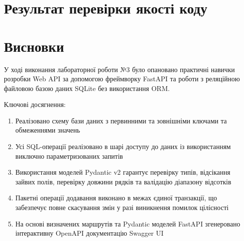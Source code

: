 \documentclass[12pt, a4paper]{article}
\begin{document}
\section{Результат перевірки якості коду}
\section{Висновки}
У ході виконання лабораторної роботи №3 було опановано практичні навички розробки Web API за допомогою фреймворку FastAPI та роботи з реляційною файловою базою даних SQLite без використання ORM.

Ключові досягнення:
\begin{enumerate}
	\item Реалізовано схему бази даних з первинними та зовнішніми ключами та обмеженнями значень
	\item Усі SQL-операції реалізовано в шарі доступу до даних із використанням виключно параметризованих запитів
	\item Використання моделей Pydantic v2 гарантує перевірку типів, відсікання зайвих полів, перевірку довжини рядків та валідацію діапазону відсотків
	\item Пакетні операції додавання виконано в межах єдиної транзакції, що забезпечує повне скасування змін у разі виникнення помилок цілісності
	\item На основі визначених маршрутів та Pydantic моделей FastAPI згенеровано інтерактивну OpenAPI документацію Swagger UI
\end{enumerate}
\end{document}
